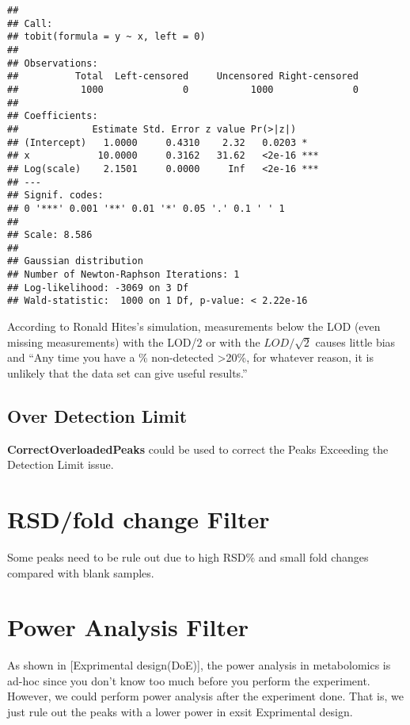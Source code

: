 \documentclass[
]{book}
\begin{document}
\begin{verbatim}
## 
## Call:
## tobit(formula = y ~ x, left = 0)
## 
## Observations:
##          Total  Left-censored     Uncensored Right-censored 
##           1000              0           1000              0 
## 
## Coefficients:
##             Estimate Std. Error z value Pr(>|z|)    
## (Intercept)   1.0000     0.4310    2.32   0.0203 *  
## x            10.0000     0.3162   31.62   <2e-16 ***
## Log(scale)    2.1501     0.0000     Inf   <2e-16 ***
## ---
## Signif. codes:  
## 0 '***' 0.001 '**' 0.01 '*' 0.05 '.' 0.1 ' ' 1
## 
## Scale: 8.586 
## 
## Gaussian distribution
## Number of Newton-Raphson Iterations: 1 
## Log-likelihood: -3069 on 3 Df
## Wald-statistic:  1000 on 1 Df, p-value: < 2.22e-16
\end{verbatim}

According to Ronald Hites's simulation\citep{hites2019}, measurements below the LOD (even missing measurements) with the LOD/2 or with the \(LOD/\sqrt2\) causes little bias and ``Any time you have a \% non-detected \textgreater20\%, for whatever reason, it is unlikely that the data set can give useful results.''

\hypertarget{over-detection-limit}{%
\subsection{Over Detection Limit}\label{over-detection-limit}}

\textbf{CorrectOverloadedPeaks} could be used to correct the Peaks Exceeding the Detection Limit issue\citep{lisec2016}.

\hypertarget{rsdfold-change-filter}{%
\section{RSD/fold change Filter}\label{rsdfold-change-filter}}

Some peaks need to be rule out due to high RSD\% and small fold changes compared with blank samples.

\hypertarget{power-analysis-filter}{%
\section{Power Analysis Filter}\label{power-analysis-filter}}

As shown in {[}Exprimental design(DoE){]}, the power analysis in metabolomics is ad-hoc since you don't know too much before you perform the experiment. However, we could perform power analysis after the experiment done. That is, we just rule out the peaks with a lower power in exsit Exprimental design.
\end{document}

